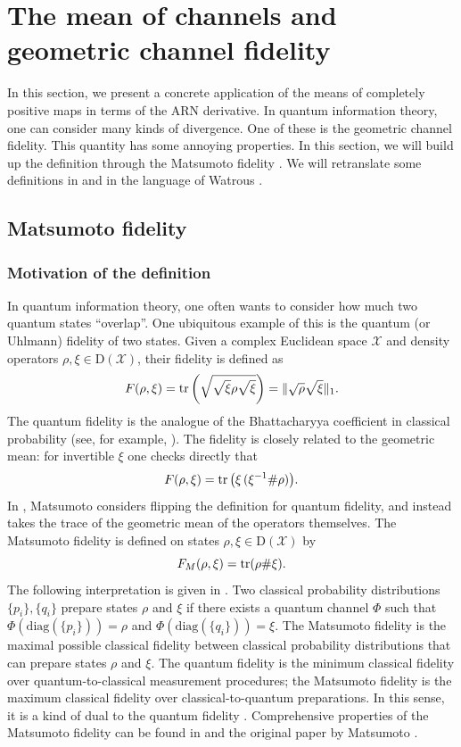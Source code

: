  
 
\section{The mean of channels and geometric channel fidelity}\label{cont:sec:fidelity}
 
In this section, we present a concrete application of the means of completely positive maps in terms of the ARN derivative. In quantum information theory, one can consider many kinds of divergence. One of these is the geometric channel fidelity. This quantity has some annoying properties. In this section, we will build up the definition through the Matsumoto fidelity \cite{matsumoto2010reverse}. We will retranslate some definitions in \cite{matsumoto2010reverse} and \cite{KatariyaWilde2021} in the language of Watrous \cite{watrous2018theory}. 
 
\subsection{Matsumoto fidelity}
\subsubsection{Motivation of the definition}
In quantum information theory, one often wants to consider how much two quantum states ``overlap''. One ubiquitous example of this is the quantum (or Uhlmann) fidelity \cite{Uhlmann1976} of two states. Given a complex Euclidean space $\mathcal{X}$ and density operators $\rho, \xi\in \mathrm{D}(\mathcal{X})$, their fidelity is defined as 
\[F(\rho,\xi)=\operatorname{tr}\left(\sqrt{\sqrt{\xi}\rho\sqrt{\xi}}\right)=\|\sqrt{\rho}\sqrt{\xi}\|_1.\]
The quantum fidelity is the analogue of the Bhattacharyya coefficient in classical probability (see, for example, \cite[Section~3.2]{watrous2018theory}). The fidelity is closely related to the geometric mean: for invertible $\xi$ one checks directly that 
\[F(\rho,\xi)=\operatorname{tr}\big(\xi\,(\xi^{-1}\#\rho)\big).\] In \cite{matsumoto2010reverse}, Matsumoto considers flipping the definition for quantum fidelity, and instead takes the trace of the geometric mean of the operators themselves. The Matsumoto fidelity is defined on states $\rho, \xi\in \mathrm{D}(\mathcal{X})$ by 
\[
    F_M(\rho,\xi)=\operatorname{tr}(\rho\#\xi).
\]
The following interpretation is given in \cite{cree2020fidelity}. Two classical probability distributions $\{p_i\}, \{q_i\}$ prepare states $\rho$ and $\xi$ if there exists a quantum channel $\Phi$ such that $\Phi(\mathrm{diag}(\{p_i\}))=\rho$ and $\Phi(\mathrm{diag}(\{q_i\}))=\xi$. The Matsumoto fidelity is the maximal possible classical fidelity between classical probability distributions that can prepare states $\rho$ and $\xi$. The quantum fidelity is the minimum classical fidelity over quantum-to-classical measurement procedures; the Matsumoto fidelity is the maximum classical fidelity over classical-to-quantum preparations. In this sense, it is a kind of dual to the quantum fidelity \cite{cree2020fidelity}. Comprehensive properties of the Matsumoto fidelity can be found in \cite{cree2020fidelity} and the original paper by Matsumoto \cite{matsumoto2010reverse}.
 
